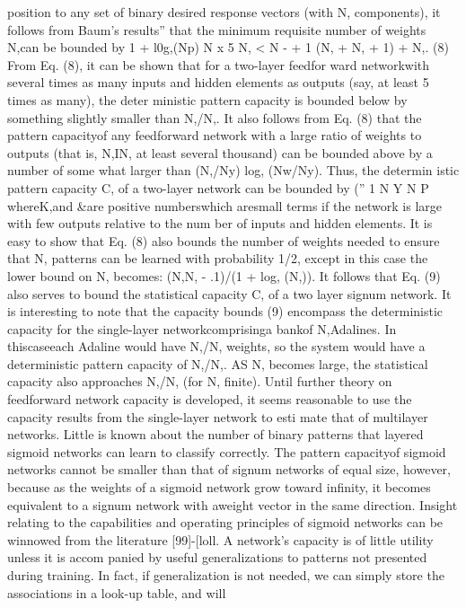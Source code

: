 \documentclass[11pt,a4paper,twocolumn]{article}
\begin{document}
position to any set of binary desired response vectors (with 
N, components), it follows from Baum’s results” that the 
minimum requisite number of weights N,can 
be bounded 
by 
1 + l0g,(Np) 
N x  
5 N, 
< N - + 1 (N, + N, + 1) + N,. 
(8) 
From Eq. (8), it can be shown that for a two-layer feedfor
ward networkwith several times as many inputs and hidden 
elements as outputs (say, at least 5 times as many), the deter
ministic pattern capacity is bounded below by something 
slightly smaller than N,/N,. 
It also follows from Eq. (8) that 
the pattern capacityof any feedforward network with a large 
ratio of weights to outputs (that is, N,IN, 
at least several 
thousand) can be bounded above by a number of some
what larger than (N,/Ny) log, (Nw/Ny). Thus, the determin
istic pattern capacity C, 
of a two-layer network can be 
bounded by 
(” 
1 
N Y N P  
whereK,and \&are positive numberswhich aresmall terms 
if the network is large with few outputs relative to the num
ber of inputs and hidden elements. 
It is easy to show that Eq. (8) also bounds the number of 
weights needed to ensure that N, patterns can be learned 
with probability 1/2, except in this case the lower bound on 
N, 
becomes: (N,N, - .1)/(1 + log, (N,)). 
It follows that Eq. 
(9) also serves to bound the statistical capacity C, of a two
layer signum network. 
It is interesting to note that the capacity bounds (9) 
encompass the deterministic capacity for the single-layer 
networkcomprisinga bankof N,Adalines. In thiscaseeach 
Adaline would have N,/N, 
weights, so the system would 
have a deterministic pattern capacity of N,/N,. 
AS N, 
becomes large, the statistical capacity also approaches 
N,/N, 
(for N, finite). Until further theory on feedforward 
network capacity is developed, it seems reasonable to use 
the capacity results from the single-layer network to esti
mate that of multilayer networks. 
Little is known about the number of binary patterns that 
layered sigmoid networks can learn to classify correctly. 
The pattern capacityof sigmoid networks cannot be smaller 
than that of signum networks of equal size, however, 
because as the weights of a sigmoid network grow toward 
infinity, it becomes equivalent to a signum network with 
aweight vector in the same direction. Insight relating to the 
capabilities and operating principles of sigmoid networks 
can be winnowed from the literature [99]-[loll. 
A network’s capacity is of little utility unless it is accom
panied by useful generalizations to patterns not presented 
during training. In fact, if generalization is not needed, we 
can simply store the associations in a look-up table, and will 
\end{document}
